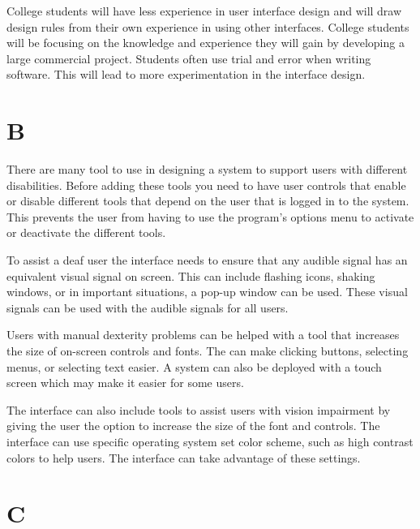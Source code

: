 \documentclass[12pt]{report}
\begin{document}
College students will have less experience in user interface design and will draw design rules from their own experience in using other interfaces.  College students will be focusing on the knowledge and experience they will gain by developing a large commercial project.  Students often use trial and error when writing software.  This will lead to more experimentation in the interface design.   

\chapter*{B}

There are many tool to use in designing a system to support users with different disabilities.  Before adding these tools you need to have user controls that enable or disable different tools that depend on the user that is logged in to the system.  This prevents the user from having to use the program's options menu to activate or deactivate the different tools.

To assist a deaf user the interface needs to ensure that any audible signal has an equivalent visual signal on screen.  This can include flashing icons, shaking windows, or in important situations, a pop-up window can be used.  These visual signals can be used with the audible signals for all users.

Users with manual dexterity problems can be helped with a tool that increases the size of on-screen controls and fonts.  The can make clicking buttons, selecting menus, or selecting text easier.  A system can also be deployed with a touch screen which may make it easier for some users.

The interface can also include tools to assist users with vision impairment by giving the user the option to increase the size of the font and controls.  The interface can use specific operating system set color scheme, such as high contrast colors to help users.  The interface can take advantage of these settings.

\chapter*{C}
\end{document}
